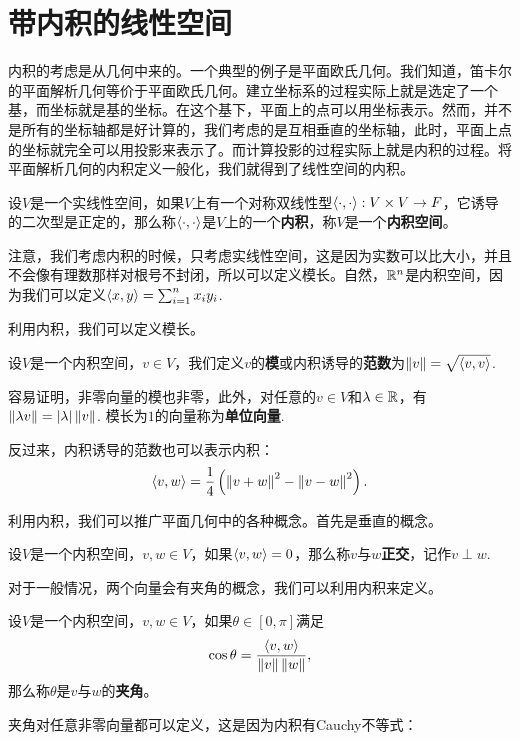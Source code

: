 \section{带内积的线性空间}
内积的考虑是从几何中来的。一个典型的例子是平面欧氏几何。我们知道，笛卡尔的平面解析几何等价于平面欧氏几何。建立坐标系的过程实际上就是选定了一个基，而坐标就是基的坐标。在这个基下，平面上的点可以用坐标表示。然而，并不是所有的坐标轴都是好计算的，我们考虑的是互相垂直的坐标轴，此时，平面上点的坐标就完全可以用投影来表示了。而计算投影的过程实际上就是内积的过程。将平面解析几何的内积定义一般化，我们就得到了线性空间的内积。


\begin{definition}[内积]
设$V$是一个实线性空间，如果$V$上有一个对称双线性型$\left\langle{\cdot},{\cdot}\right\rangle:V\times V\to F$，它诱导的二次型是正定的，那么称$\left\langle{\cdot},{\cdot}\right\rangle$是$V$上的一个\textbf{内积}，称$V$是一个\textbf{内积空间}。
\end{definition}
注意，我们考虑内积的时候，只考虑实线性空间，这是因为实数可以比大小，并且不会像有理数那样对根号不封闭，所以可以定义模长。自然，$\mathbb{R}^n$是内积空间，因为我们可以定义$\left\langle{x},{y}\right\rangle=\sum_{i=1}^n x_iy_i$. 

利用内积，我们可以定义模长。

\begin{definition}[模]
设$V$是一个内积空间，$v\in V$，我们定义$v$的\textbf{模}或内积诱导的\textbf{范数}为$\left\|v\right\|=\sqrt{\left\langle{v},{v}\right\rangle}$.
\end{definition}

容易证明，非零向量的模也非零，此外，对任意的$v\in V$和$\lambda\in\mathbb{R}$，有$\left\|\lambda v\right\|=|\lambda|\left\|v\right\|$. 模长为$1$的向量称为\textbf{单位向量}.

反过来，内积诱导的范数也可以表示内积：
\begin{equation}
    \left\langle{v},{w}\right\rangle=\frac{1}{4}\left(\left\|v+w\right\|^2-\left\|v-w\right\|^2\right).\label{eq:inner}
\end{equation}

利用内积，我们可以推广平面几何中的各种概念。首先是垂直的概念。

\begin{definition}[正交]
设$V$是一个内积空间，$v,w\in V$，如果$\left\langle{v},{w}\right\rangle=0$，那么称$v$与$w$\textbf{正交}，记作$v\perp w$.
\end{definition}

对于一般情况，两个向量会有夹角的概念，我们可以利用内积来定义。

\begin{definition}[夹角]
设$V$是一个内积空间，$v,w\in V$，如果$\theta\in[0,\pi]$满足
\[
    \cos\theta=\frac{\left\langle{v},{w}\right\rangle}{\left\|v\right\|\left\|w\right\|},
\]
那么称$\theta$是$v$与$w$的\textbf{夹角}。
\end{definition}
夹角对任意非零向量都可以定义，这是因为内积有Cauchy不等式：

